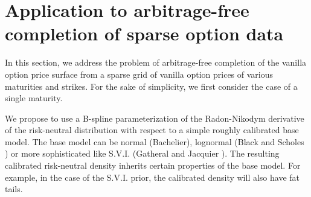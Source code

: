 \documentclass[a4paper]{article}
\newcommand{\1}{\textbf{1}}
\begin{document}

\section{Application to arbitrage-free completion of sparse option data}\label{sec:arbitrage_free_interpolation}
\par In this section, we address the problem of arbitrage-free completion of the vanilla option price surface from a sparse grid of vanilla option prices of various maturities and strikes. For the sake of simplicity, we first consider the case of a single maturity. 
\par We propose to use a B-spline parameterization of the Radon-Nikodym derivative of the risk-neutral distribution with respect to a simple roughly calibrated base model. The base model can be normal (Bachelier), lognormal (Black and Scholes \cite{BlackScholes73}) or more sophisticated like S.V.I. (Gatheral and Jacquier \cite{GatheralJacquierGlobalSVI}). The resulting calibrated risk-neutral density inherits certain properties of the base model. For example, in the case of the S.V.I. prior, the calibrated density will also have fat tails. 
\end{document}
